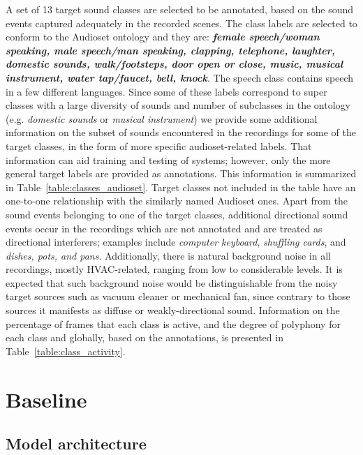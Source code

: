 \documentclass{article}
\begin{document}
\begin{sloppy}
A set of 13 target sound classes are selected to be annotated, based on the sound events captured adequately in the recorded scenes. The class labels are selected to conform to the Audioset ontology \cite{gemmeke2017audio} and they are: \textbf{\emph{female speech/woman speaking, male speech/man speaking, clapping, telephone, laughter, domestic sounds, walk/footsteps, door open or close, music, musical instrument, water tap/faucet, bell, knock}}. The speech class contains speech in a few different languages. Since some of these labels correspond to super classes with a large diversity of sounds and number of subclasses in the ontology (e.g. \emph{domestic sounds} or \emph{musical instrument}) we provide some additional information on the subset of sounds encountered in the recordings for some of the target classes, in the form of more specific audioset-related labels. That information can aid training and testing of systems; however, only the more general target labels are provided as annotations. This information is summarized in Table~\ref{table:classes_audioset}. Target classes not included in the table have an one-to-one relationship with the similarly named Audioset ones. Apart from the sound events belonging to one of the target classes, additional directional sound events occur in the recordings which are not annotated and are treated as directional interferers; examples include \emph{computer keyboard}, \emph{shuffling cards}, and \emph{dishes, pots, and pans}. Additionally, there is natural background noise in all recordings, mostly HVAC-related, ranging from low to considerable levels. It is expected that such background noise would be distinguishable from the noisy target sources such as vacuum cleaner or mechanical fan, since contrary to those sources it manifests as diffuse or weakly-directional sound. Information on the percentage of frames that each class is active, and the degree of polyphony for each class and globally, based on the annotations, is presented in Table~\ref{table:class_activity}.





\section{Baseline}
\label{sec:baseline}

\subsection{Model architecture}


\end{sloppy}
\end{document}
